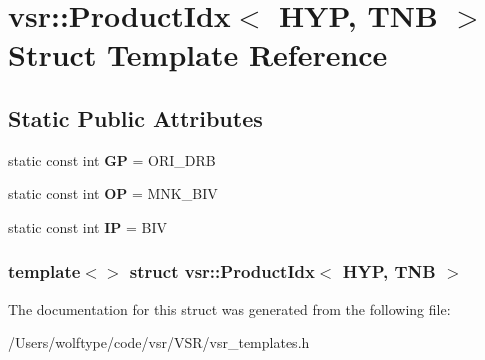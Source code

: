 \hypertarget{structvsr_1_1_product_idx_3_01_h_y_p_00_01_t_n_b_01_4}{\section{vsr\-:\-:Product\-Idx$<$ H\-Y\-P, T\-N\-B $>$ Struct Template Reference}
\label{structvsr_1_1_product_idx_3_01_h_y_p_00_01_t_n_b_01_4}
}
\subsection*{Static Public Attributes}
\begin{DoxyCompactItemize}
\item 
\hypertarget{structvsr_1_1_product_idx_3_01_h_y_p_00_01_t_n_b_01_4_a371d6f96d48d7e5f7dae215b5ab7773f}{static const int {\bfseries G\-P} = O\-R\-I\-\_\-\-D\-R\-B}\label{structvsr_1_1_product_idx_3_01_h_y_p_00_01_t_n_b_01_4_a371d6f96d48d7e5f7dae215b5ab7773f}

\item 
\hypertarget{structvsr_1_1_product_idx_3_01_h_y_p_00_01_t_n_b_01_4_a870fb1001b24ec9ed5ed7aa9dc6a3037}{static const int {\bfseries O\-P} = M\-N\-K\-\_\-\-B\-I\-V}\label{structvsr_1_1_product_idx_3_01_h_y_p_00_01_t_n_b_01_4_a870fb1001b24ec9ed5ed7aa9dc6a3037}

\item 
\hypertarget{structvsr_1_1_product_idx_3_01_h_y_p_00_01_t_n_b_01_4_adff6f749b41e629aec6d4b16e7de1ed4}{static const int {\bfseries I\-P} = B\-I\-V}\label{structvsr_1_1_product_idx_3_01_h_y_p_00_01_t_n_b_01_4_adff6f749b41e629aec6d4b16e7de1ed4}

\end{DoxyCompactItemize}
\subsubsection*{template$<$$>$ struct vsr\-::\-Product\-Idx$<$ H\-Y\-P, T\-N\-B $>$}



The documentation for this struct was generated from the following file\-:\begin{DoxyCompactItemize}
\item 
/\-Users/wolftype/code/vsr/\-V\-S\-R/vsr\-\_\-templates.\-h\end{DoxyCompactItemize}
